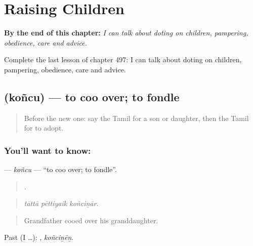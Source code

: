
\chapter{Raising Children}
\label{ch:ta-raising-children}

\begin{chapteropening}
\textbf{By the end of this chapter:} \emph{I can talk about doting on children, pampering, obedience, care and advice.}

Complete the last lesson of chapter 497: I can talk about doting on children, pampering, obedience, care and advice.
\end{chapteropening}

\section[\texorpdfstring{\ta{கொஞ்சு} (koñcu)}{கொஞ்சு (koñcu)}]{ (koñcu) — to coo over; to fondle}

\label{lesson:TA-C497-koncu}



\begin{quote}
Before the new one: say the Tamil for a son or daughter, then the Tamil for to adopt.
\end{quote}

\subsection*{You'll want to know: }
\textbf{} — \emph{koñcu} — \textquotedblleft{}to coo over; to fondle\textquotedblright{}.

\begin{quote}
  .
\end{quote}

\begin{quote}
\emph{tāttā pēttiyaik koñciṉār.}
\end{quote}

\begin{quote}
Grandfather cooed over his granddaughter.
\end{quote}

Past (I …): , \emph{koñciṉēṉ}.

